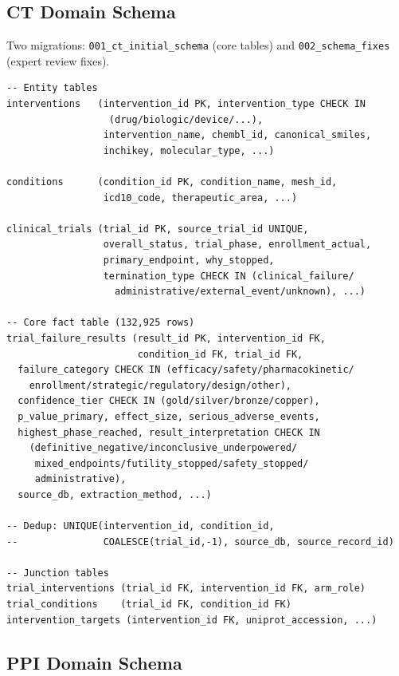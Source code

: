 \subsection{CT Domain Schema}

Two migrations: \texttt{001\_ct\_initial\_schema} (core tables) and \texttt{002\_schema\_fixes} (expert review fixes).

\begin{small}
\begin{verbatim}
-- Entity tables
interventions   (intervention_id PK, intervention_type CHECK IN
                  (drug/biologic/device/...),
                 intervention_name, chembl_id, canonical_smiles,
                 inchikey, molecular_type, ...)

conditions      (condition_id PK, condition_name, mesh_id,
                 icd10_code, therapeutic_area, ...)

clinical_trials (trial_id PK, source_trial_id UNIQUE,
                 overall_status, trial_phase, enrollment_actual,
                 primary_endpoint, why_stopped,
                 termination_type CHECK IN (clinical_failure/
                   administrative/external_event/unknown), ...)

-- Core fact table (132,925 rows)
trial_failure_results (result_id PK, intervention_id FK,
                       condition_id FK, trial_id FK,
  failure_category CHECK IN (efficacy/safety/pharmacokinetic/
    enrollment/strategic/regulatory/design/other),
  confidence_tier CHECK IN (gold/silver/bronze/copper),
  p_value_primary, effect_size, serious_adverse_events,
  highest_phase_reached, result_interpretation CHECK IN
    (definitive_negative/inconclusive_underpowered/
     mixed_endpoints/futility_stopped/safety_stopped/
     administrative),
  source_db, extraction_method, ...)

-- Dedup: UNIQUE(intervention_id, condition_id,
--               COALESCE(trial_id,-1), source_db, source_record_id)

-- Junction tables
trial_interventions (trial_id FK, intervention_id FK, arm_role)
trial_conditions    (trial_id FK, condition_id FK)
intervention_targets (intervention_id FK, uniprot_accession, ...)
\end{verbatim}
\end{small}

\subsection{PPI Domain Schema}

